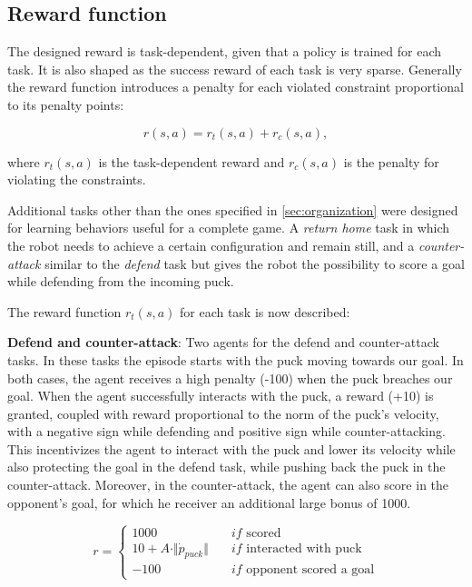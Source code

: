 \subsection{Reward function}
\label{subseq:reward}
The designed reward is task-dependent, given that a policy is trained for each task. It is also shaped as the success reward of each task is very sparse.
Generally the reward function introduces a penalty for each violated constraint proportional to its penalty points:

\begin{equation}
    r(s,a) = r_t(s,a) + r_c(s,a),
\end{equation}

where $r_t(s,a)$ is the task-dependent reward and $r_c(s,a)$ is the penalty for violating the constraints.


Additional tasks other than the ones specified in \ref{sec:organization} were designed for learning behaviors useful for a complete game. A \textit{return home} task in which the robot needs to achieve a certain configuration and remain still,
and a \textit{counter-attack} similar to the \textit{defend} task but gives the robot the possibility to score a goal while defending from the incoming puck.

The reward function $r_t(s,a)$ for each task is now described:

\textbf{Defend and counter-attack}: 
Two agents for the defend and counter-attack tasks. In these
tasks the episode starts with the puck moving towards our goal. In both cases, the agent receives a
high penalty (-100) when the puck breaches our goal. When the agent successfully interacts with the
puck, a reward (+10) is granted, coupled with reward proportional to the norm of the puck's velocity,
with a negative sign while defending and positive sign while counter-attacking. This incentivizes the
agent to interact with the puck and lower its velocity while also protecting the goal in the defend task,
while pushing back the puck in the counter-attack. Moreover, in the counter-attack, the agent can also
score in the opponent's goal, for which he receiver an additional large bonus of 1000.

\begin{equation*}
    r = \left\{
        \begin{aligned}
            1000 \quad &if \text{ scored} \\
            10 + A \cdot \Vert \dot{p}_{puck} \Vert \quad &if \text{ interacted with puck} \\
            -100 \quad &if \text{ opponent scored a goal}
        \end{aligned}
    \right.
\end{equation*}

